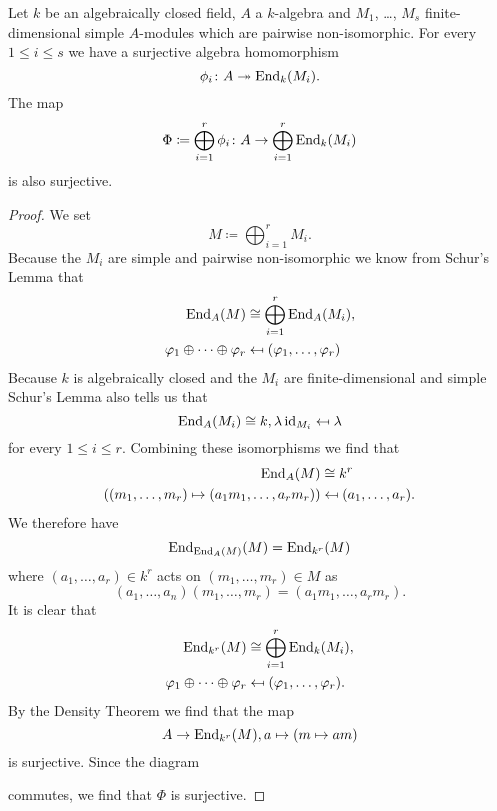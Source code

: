 \begin{lem}\label{lem: map into sum endomorphisms surjective}
  Let $k$ be an algebraically closed field, $A$ a $k$-algebra and $M_1$, \dots, $M_s$ finite-dimensional simple $A$-modules which are pairwise non-isomorphic. For every $1 \leq i \leq s$ we have a surjective algebra homomorphism
  \[
    \phi_i \colon A \twoheadrightarrow \operatorname{End}_k(M_i).
  \]
  The map
  \[
    \Phi \coloneqq \bigoplus_{i=1}^r \phi_i \colon A \to \bigoplus_{i=1}^r \operatorname{End}_k(M_i)
  \]
  is also surjective.
\end{lem}
\begin{proof}
  We set
  \[
    M \coloneqq \bigoplus_{i=1}^r M_i.
  \]
  Because the $M_i$ are simple and pairwise non-isomorphic we know from Schur’s Lemma that
  \begin{align*}
    \operatorname{End}_A(M) &\cong \bigoplus_{i=1}^r \operatorname{End}_A(M_i), \\
    \varphi_1 \oplus \dotsb \oplus \varphi_r &\mapsfrom (\varphi_1, \dotsc, \varphi_r)
  \end{align*}
  Because $k$ is algebraically closed and the $M_i$ are finite-dimensional and simple Schur’s Lemma also tells us that
  \[
    \operatorname{End}_A(M_i) \cong k, \lambda \operatorname{id}_{M_i} \mapsfrom \lambda
  \]
  for every $1 \leq i \leq r$. Combining these isomorphisms we find that
  \begin{align*}
    \operatorname{End}_A(M) &\cong k^r \\
    ((m_1, \dotsc, m_r) \mapsto (a_1 m_1, \dotsc, a_r m_r)) & \mapsfrom (a_1, \dotsc, a_r).
  \end{align*}
  We therefore have
  \[
    \operatorname{End}_{\operatorname{End}_A(M)}(M) = \operatorname{End}_{k^r}(M)
  \]
  where $(a_1, \dotsc, a_r) \in k^r$ acts on $(m_1, \dotsc, m_r) \in M$ as
  \[
    (a_1, \dotsc, a_n)(m_1, \dotsc, m_r) = (a_1 m_1, \dotsc, a_r m_r).
  \]
  It is clear that
  \begin{align*}
    \operatorname{End}_{k^r}(M) &\cong \bigoplus_{i=1}^r \operatorname{End}_k(M_i), \\
    \varphi_1 \oplus \dotsb \oplus \varphi_r &\mapsfrom (\varphi_1, \dotsc, \varphi_r).
  \end{align*}
  By the Density Theorem we find that the map
  \[
    A \to \operatorname{End}_{k^r}(M), a \mapsto (m \mapsto am)
  \]
  is surjective. Since the diagram
  \begin{center}
  \end{center}
  commutes, we find that $\Phi$ is surjective.
\end{proof}


